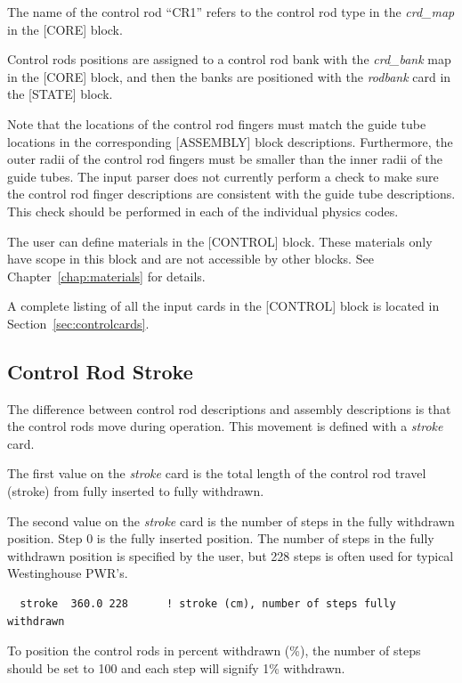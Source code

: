 The name of the control rod ``CR1'' refers to the control rod type in the
{\it crd\_map} in the [CORE] block.

Control rods positions are assigned to a control rod bank with the {\it crd\_bank} map
in the [CORE] block, and then the banks are positioned with the 
{\it rodbank} card in the [STATE] block.

Note that the locations of the control rod fingers must match the guide tube locations in the
corresponding [ASSEMBLY] block descriptions.  Furthermore, the outer radii of the control
rod fingers must be smaller than the inner radii of the guide tubes.
The input parser does not currently perform a check to make sure the control rod finger
descriptions are consistent with the guide tube descriptions.
This check should be performed in each of the individual physics codes.

The user can define materials in the [CONTROL] block.  These materials only have scope in
this block and are not accessible by other blocks.  See Chapter~\ref{chap:materials} for details.

A complete listing of all the input cards in the [CONTROL] block is located in Section~\ref{sec:controlcards}.

\subsection{Control Rod Stroke}
\label{sec:stroke}

The difference between control rod descriptions and assembly descriptions is that
the control rods move during operation.  This movement is defined with a {\it stroke} card.

The first value on the {\it stroke} card is the total length of the control rod travel (stroke)
from fully inserted to fully withdrawn.

The second value on the {\it stroke} card is the number of steps in the fully withdrawn position.
Step 0 is the fully inserted position.  The number of steps in the fully withdrawn position 
is specified by the user, but 228 steps is often used for typical Westinghouse PWR's.
\begin{verbatim}
  stroke  360.0 228      ! stroke (cm), number of steps fully withdrawn
\end{verbatim}

To position the control rods in percent withdrawn (\%), the number of steps should be set to 100 and
each step will signify 1\% withdrawn.

